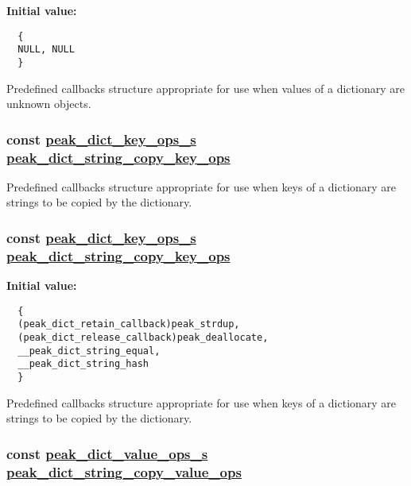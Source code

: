 {\bf Initial value:}

\footnotesize\begin{verbatim}
  {
  NULL, NULL
  }
\end{verbatim}\normalsize 
Predefined callbacks structure appropriate for use when values of a dictionary are unknown objects. \hypertarget{group__dict_ga10}{
\subsubsection[peak\_\-dict\_\-string\_\-copy\_\-key\_\-ops]{\setlength{\rightskip}{0pt plus 5cm}const \hyperlink{structpeak__dict__key__ops__s}{peak\_\-dict\_\-key\_\-ops\_\-s} \hyperlink{group__dict_ga10}{peak\_\-dict\_\-string\_\-copy\_\-key\_\-ops}}}
\label{group__dict_ga10}


Predefined callbacks structure appropriate for use when keys of a dictionary are strings to be copied by the dictionary. \hypertarget{group__dict_ga9}{
\subsubsection[peak\_\-dict\_\-string\_\-copy\_\-key\_\-ops]{\setlength{\rightskip}{0pt plus 5cm}const \hyperlink{structpeak__dict__key__ops__s}{peak\_\-dict\_\-key\_\-ops\_\-s} \hyperlink{group__dict_ga10}{peak\_\-dict\_\-string\_\-copy\_\-key\_\-ops}}}
\label{group__dict_ga9}


{\bf Initial value:}

\footnotesize\begin{verbatim}
  {
  (peak_dict_retain_callback)peak_strdup,
  (peak_dict_release_callback)peak_deallocate,
  __peak_dict_string_equal,
  __peak_dict_string_hash
  }
\end{verbatim}\normalsize 
Predefined callbacks structure appropriate for use when keys of a dictionary are strings to be copied by the dictionary. \hypertarget{group__dict_ga20}{
\subsubsection[peak\_\-dict\_\-string\_\-copy\_\-value\_\-ops]{\setlength{\rightskip}{0pt plus 5cm}const \hyperlink{structpeak__dict__value__ops__s}{peak\_\-dict\_\-value\_\-ops\_\-s} \hyperlink{group__dict_ga20}{peak\_\-dict\_\-string\_\-copy\_\-value\_\-ops}}}
\label{group__dict_ga20}


